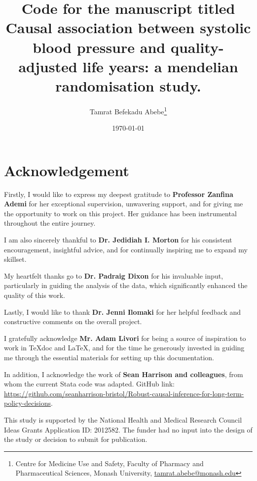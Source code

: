 \documentclass[11pt]{article}
\begin{document}
\title{Code for the manuscript titled Causal association between systolic blood pressure and quality-adjusted life years: a mendelian randomisation study.}
\author{Tamrat Befekadu Abebe\thanks{Centre for Medicine Use and Safety, Faculty of Pharmacy and Pharmaceutical Sciences, Monash University, \href{mailto:tamrat.abebe@monash.edu}{tamrat.abebe@monash.edu}}}
\date{\today}

\maketitle
\newpage %

\tableofcontents
\newpage %

\section{Acknowledgement}

Firstly, I would like to express my deepest gratitude to \textbf{Professor Zanfina Ademi} for her exceptional supervision, unwavering support, and for giving me the opportunity to work on this project. Her guidance has been instrumental throughout the entire journey.

I am also sincerely thankful to \textbf{Dr. Jedidiah I. Morton} for his consistent encouragement, insightful advice, and for continually inspiring me to expand my skillset.

My heartfelt thanks go to \textbf{Dr. Padraig Dixon} for his invaluable input, particularly in guiding the analysis of the data, which significantly enhanced the quality of this work.

Lastly, I would like to thank \textbf{Dr. Jenni Ilomaki} for her helpful feedback and constructive comments on the overall project.

I gratefully acknowledge \textbf{Mr. Adam Livori} for being a source of inspiration to work in TeXdoc and LaTeX, and for the time he generously invested in guiding me through the essential materials for setting up this documentation.

In addition, I acknowledge the work of \textbf{Sean Harrison and colleagues}\cite{harrison2021long}, from whom the current Stata code was adapted. GitHub link: \color{blue}\url{https://github.com/seanharrison-bristol/Robust-causal-inference-for-long-term-policy-decisions}.\color{black}

This study is supported by the National Health and Medical Research Council Ideas Grants Application ID: 2012582. The funder had no input into the design of the study or decision to submit for publication.
\color{black}
\newpage
\end{document}
